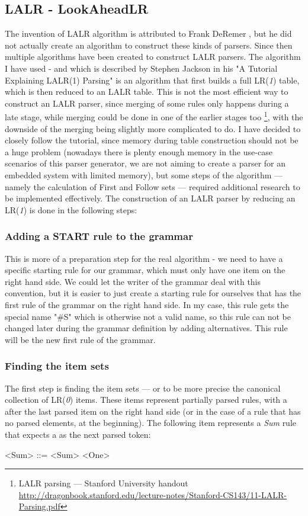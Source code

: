 \subsection{LALR - LookAheadLR}
The invention of LALR algorithm is attributed to Frank DeRemer \cite{deremer1969practical}, but he did not actually create an algorithm to construct these kinds of parsers. Since then multiple algorithms have been created to construct LALR parsers. The algorithm I have used - and which is described by Stephen Jackson in his "A Tutorial Explaining LALR(1) Parsing" \cite{lalr1} is an algorithm that first builds a full LR(\textit{1}) table, which is then reduced to an LALR table. This is not the most efficient way to construct an LALR parser, since merging of some rules only happens during a late stage, while merging could be done in one of the earlier stages too \footnote{LALR parsing --- Stanford University handout \url{http://dragonbook.stanford.edu/lecture-notes/Stanford-CS143/11-LALR-Parsing.pdf}}, with the downside of the merging being slightly more complicated to do. I have decided to closely follow the tutorial, since memory during table construction should not be a huge problem (nowadays there is plenty enough memory in the use-case scenarios of this parser generator, we are not aiming to create a parser for an embedded system with limited memory), but some steps of the algorithm ---  namely the calculation of First and Follow sets --- required additional research to be implemented effectively.
The construction of an LALR parser by reducing an LR(\textit{1}) is done in the following steps:
\subsubsection{Adding a START rule to the grammar}
This is more of a preparation step for the real algorithm - we need to have a specific starting rule for our grammar, which must only have one item on the right hand side. We could let the writer of the grammar deal with this convention, but it is easier to just create a starting rule for ourselves that has the first rule of the grammar on the right hand side. In my case, this rule gets the special name "\#S" which is otherwise not a valid name, so this rule can not be changed later during the grammar definition by adding alternatives. This rule will be the new first rule of the grammar. 
\subsubsection{Finding the item sets} 
The first step is finding the item sets --- or to be more precise the canonical collection of LR(\textit{0}) items. These items represent partially parsed rules, with a \textbullet after the last parsed item on the right hand side (or in the case of a rule that has no parsed elements, at the beginning). The following item represents a \textit{Sum} rule that expects a \lit{+} as the next parsed token:
\begin{grammar}
<Sum> ::= <Sum> \textbullet \lit{+} <One>
\end{grammar}

